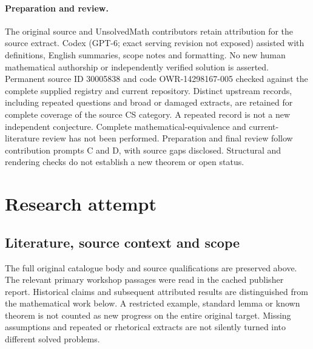 \documentclass[11pt]{article}
\begin{document}
\paragraph{Preparation and review.}
The original source and UnsolvedMath contributors retain attribution for the source extract. Codex (GPT-6; exact serving revision not exposed) assisted with definitions, English summaries, scope notes and formatting. No new human mathematical authorship or independently verified solution is asserted. Permanent source ID 30005838 and code OWR-14298167-005 checked against the complete supplied registry and current repository. Distinct upstream records, including repeated questions and broad or damaged extracts, are retained for complete coverage of the source CS category. A repeated record is not a new independent conjecture. Complete mathematical-equivalence and current-literature review has not been performed. Preparation and final review follow contribution prompts C and D, with source gaps disclosed. Structural and rendering checks do not establish a new theorem or open status.
\label{end:30005838}

\section{Research attempt}
\subsection{Literature, source context and scope}
The full original catalogue body and source qualifications are preserved above. The relevant primary workshop passages were read in the cached publisher report. Historical claims and subsequent attributed results are distinguished from the mathematical work below. A restricted example, standard lemma or known theorem is not counted as new progress on the entire original target. Missing assumptions and repeated or rhetorical extracts are not silently turned into different solved problems.
\end{document}
